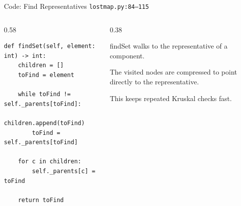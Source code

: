 \documentclass[aspectratio=169,11pt]{beamer}
\begin{document}
\begin{frame}[fragile]{Code: Find Representatives}
\scriptsize
{} \texttt{lostmap.py:84--115}

\vspace{0.08cm}
\begin{columns}[T,totalwidth=\textwidth]
\begin{column}{0.58\textwidth}
\begin{lstlisting}[style=cpcode]
def findSet(self, element: int) -> int:
    children = []
    toFind = element

    while toFind != self._parents[toFind]:
        children.append(toFind)
        toFind = self._parents[toFind]

    for c in children:
        self._parents[c] = toFind

    return toFind
\end{lstlisting}
\end{column}
\begin{column}{0.38\textwidth}
\begin{tightitemize}
  \item findSet walks to the representative of a component.
  \item The visited nodes are compressed to point directly to the representative.
  \item This keeps repeated Kruskal checks fast.
\end{tightitemize}
\end{column}
\end{columns}
\end{frame}
\end{document}
